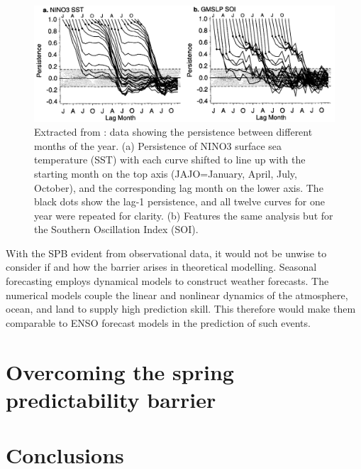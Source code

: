 \documentclass[12pt, onecolumn]{revtex4}    %
\begin{document}
\begin{figure}
\includegraphics[width=\textwidth]{data/persistence_sst_soi}
\caption[Persistence]{Extracted from \cite{torrence1998annual}: data showing the persistence between different months of the year. (a) Persistence of NINO3 surface sea temperature (SST) with each curve shifted to line up with the starting month on the top axis (JAJO=January, April, July, October), and the corresponding lag month on the lower axis. The black dots show the lag-1 persistence, and all twelve curves for one year were repeated for clarity. (b) Features the same analysis but for the Southern Oscillation Index (SOI). }
\label{fig:persistence_sst_soi}
\end{figure}

With the SPB evident from observational data, it would not be unwise to consider if and how the barrier arises in theoretical modelling. Seasonal forecasting employs dynamical models to construct weather forecasts. The numerical models couple the linear and nonlinear dynamics of the atmosphere, ocean, and land to supply high prediction skill. This therefore would make them comparable to ENSO forecast models in the prediction of such events. \cite{jan2005did} 

\section{Overcoming the spring predictability barrier}

\section{Conclusions}



\clearpage



\end{document}

